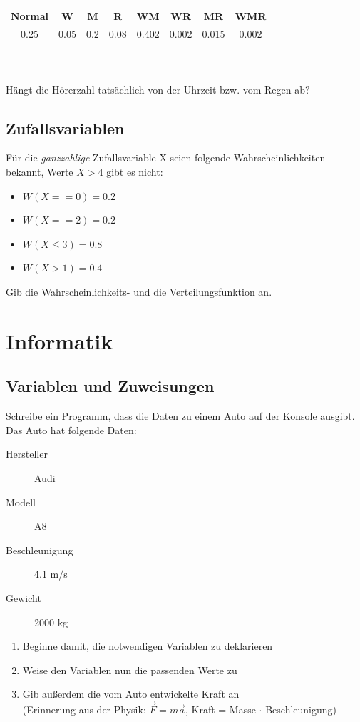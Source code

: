 \documentclass[11pt, a4paper]{article}
\begin{document}
\begin{tabular}{c|c|c|c|c|c|c|c}
	Normal & W & M & R & WM & WR & MR & WMR \\ \hline
	0.25 & 0.05 & 0.2 & 0.08 & 0.402 & 0.002 & 0.015 & 0.002
\end{tabular} \\
\\
Hängt die Hörerzahl tatsächlich von der Uhrzeit bzw. vom Regen ab?

\subsection{Zufallsvariablen}
Für die \emph{ganzzahlige} Zufallsvariable X seien folgende Wahrscheinlichkeiten bekannt, Werte $X > 4$ gibt es nicht:
\begin{itemize}
	\item $W(X == 0) = 0.2$
	\item $W(X == 2) = 0.2$
	\item $W(X \leq 3) = 0.8$
	\item $W(X > 1) = 0.4$
\end{itemize}
Gib die Wahrscheinlichkeits- und die Verteilungsfunktion an.

\newpage
\section{Informatik}
\subsection{Variablen und Zuweisungen}
Schreibe ein Programm, dass die Daten zu einem Auto auf der Konsole ausgibt. Das Auto hat folgende Daten:
\begin{description}
	\item[Hersteller] Audi
	\item[Modell] A8
	\item[Beschleunigung] 4.1 m/s
	\item[Gewicht] 2000 kg
\end{description}
\begin{enumerate}
	\item Beginne damit, die notwendigen Variablen zu deklarieren
	\item Weise den Variablen nun die passenden Werte zu
	\item Gib außerdem die vom Auto entwickelte Kraft an \\
	(Erinnerung aus der Physik: $\vec{F}=m\vec{a}$, Kraft = Masse $\cdot$ Beschleunigung)
\end{enumerate}
\end{document}
